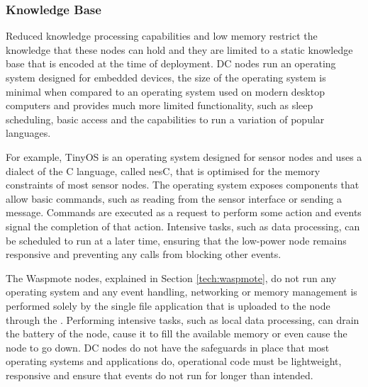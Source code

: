 	\subsubsection{Knowledge Base}
	Reduced knowledge processing capabilities and low memory restrict the knowledge that these nodes can hold and they are limited to a static knowledge base that is encoded at the time of 	deployment. DC nodes run an operating system designed for embedded devices, the size of the operating system is minimal when compared to an operating system used on modern desktop computers and provides much more limited functionality, such as sleep scheduling, basic \DIFdelbegin {}\DIFdelend \DIFaddbegin {}\DIFaddend access and the capabilities to run a variation of popular languages. 

	For example, TinyOS \cite{levis2005} is an operating system designed for sensor nodes and uses a dialect of the C language, called nesC, that is optimised for the memory constraints of most sensor nodes. The operating system exposes components that allow basic commands, such as reading from the sensor interface or sending a message. Commands are executed as a request to perform some action and events signal the completion of that action. Intensive tasks, such as data processing, can be scheduled to run at a later time, ensuring that the low-power node remains responsive and preventing any calls from blocking other events.

	The Waspmote nodes, explained in Section \ref{tech:waspmote}, do not run any operating system and any event handling, networking or memory management is performed solely by the single file application that is uploaded to the node through the \DIFdelbegin {}\DIFdelend \DIFaddbegin {}\DIFaddend . Performing intensive tasks, such as local data processing, can drain the battery of the node, cause it to fill the available memory or even cause the node to go down. DC nodes do not have the safeguards in place that most operating systems and applications do, operational code must be lightweight, responsive and ensure that events do not run for longer than intended. 

